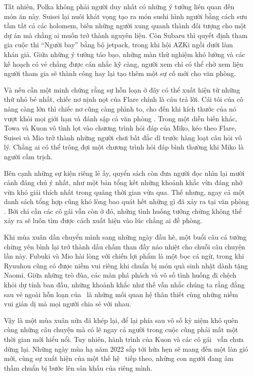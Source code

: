 \documentclass[main.tex]{subfiles}
\begin{document}
Tất nhiên, Polka không phải người duy nhất có những ý tưởng liên quan đến món ăn này. Suisei lại nuôi khát vọng tạo ra món sushi hình người bằng cách sưu tầm tất cả các holomem, biến những người xung quanh thành đối tượng cho một dự án mà chẳng ai muốn trở thành nguyên liệu. Còn Subaru thì quyết định tham gia cuộc thi ``Người bay'' bằng bộ jetpack, trong khi hội AZKi ngồi dưới làm khán giả. Giữa những ý tưởng táo bạo, những màn thử nghiệm khó lường và các kế hoạch có vẻ chẳng được cân nhắc kỹ càng, người xem chỉ có thể chờ xem liệu người tham gia sẽ thành công hay lại tạo thêm một sự cố mới cho văn phòng.

Và nếu cần một minh chứng rằng sự hỗn loạn ở đây có thể xuất hiện từ những thứ nhỏ bé nhất, chiếc nơ nịnh nọt của Flare chính là câu trả lời. Cái tôi của cô nàng càng lớn thì chiếc nơ cũng càng phình to, cho đến khi kích thước của nó vượt khỏi mọi giới hạn và đánh sập cả văn phòng \hll. Trong một diễn biến khác, Towa và Kuon vô tình lọt vào chương trình hỏi đáp của Miko, kéo theo Flare, Suisei và Mio trở thành những người chơi bất đắc dĩ trước hàng loạt câu hỏi vô lý. Chẳng ai có thể trông đợi một chương trình hỏi đáp bình thường khi Miko là người cầm trịch.

Bên cạnh những sự kiện riêng lẻ ấy, quyển sách còn đưa người đọc nhìn lại mười cảnh đáng chú ý nhất, như một bản tổng kết những khoảnh khắc vừa đáng nhớ vừa khó giải thích nhất trong quãng thời gian vừa qua. Thế nhưng, ngay cả một danh sách tổng hợp cũng khó lòng bao quát hết những gì đã xảy ra tại văn phòng \hll. Bởi chỉ cần các cô gái vẫn còn ở đó, những tình huống tưởng chừng không thể xảy ra sẽ luôn tìm được cách xuất hiện vào lúc chẳng ai đề phòng.

Khi mùa xuân dần chuyển mình sang những ngày đầu hè, một buổi câu cá tưởng chừng yên bình lại trở thành dấu chấm than đầy náo nhiệt cho chuỗi câu chuyện lần này. Fubuki và Mio hài lòng với chiến lợi phẩm là một bọc cá ngừ, trong khi Ryuuhou cũng có được niềm vui riêng khi chuẩn bị món quà sinh nhật dành tặng Naomi. Giữa những trò đùa, các màn phá phách và vô số tình huống đi chệch khỏi dự tính ban đầu, những khoảnh khắc như thế vẫn nhắc chúng ta rằng đằng sau vẻ ngoài hỗn loạn của \hll\ là những mối quan hệ thân thiết cùng những niềm vui giản dị mà mọi người chia sẻ với nhau.

Vậy là một mùa xuân nữa đã khép lại, để lại phía sau vô số kỷ niệm khó quên cùng những câu chuyện mà có lẽ ngay cả người trong cuộc cũng phải mất một thời gian mới hiểu nổi. Tuy nhiên, hành trình của Kuon và các cô gái \hll\ vẫn chưa dừng lại. Những ngày mùa hạ năm 2022 sắp tới hứa hẹn sẽ mang đến một làn gió mới, cùng sự xuất hiện của một thế hệ \hll\ tiếp theo, những con người đang âm thầm chuẩn bị bước lên sân khấu của riêng mình.
\end{document}
